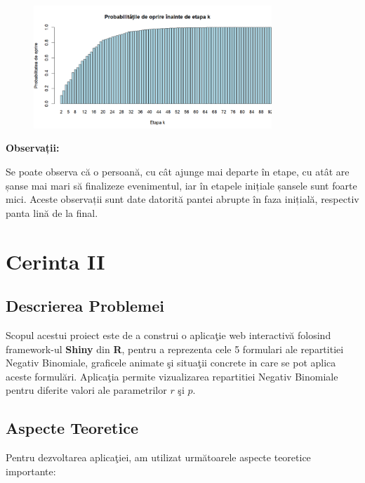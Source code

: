 \documentclass[a4paper,11pt]{article}
\begin{document}
\begin{figure}[h!]
    \centering
    \includegraphics[width=0.8\textwidth]{./img/3.png} %
    \label{fig:imaginea_ta_3}
\end{figure}
\newpage
\textbf{Observații:}

Se poate observa că o persoană, cu cât ajunge mai departe în etape, cu atât are șanse mai mari să finalizeze evenimentul, iar în etapele inițiale șansele sunt foarte mici. Aceste observații sunt date datorită pantei abrupte în faza inițială, respectiv panta lină de la final.

\newpage

\section*{Cerinta II}

\subsection*{Descrierea Problemei}

Scopul acestui proiect este de a construi o aplica\c{t}ie web interactiv\u{a} folosind framework-ul \textbf{Shiny} din \textbf{R}, pentru a reprezenta cele 5 formulari ale repartitiei Negativ Binomiale, graficele animate \c{s}i situa\c{t}ii concrete in care se pot aplica aceste formul\u{a}ri. Aplica\c{t}ia permite vizualizarea repartitiei Negativ Binomiale pentru diferite valori ale parametrilor \( r \) \c{s}i \( p \).

\subsection*{Aspecte Teoretice}
Pentru dezvoltarea aplica\c{t}iei, am utilizat urm\u{a}toarele aspecte teoretice importante:
\newline
\end{document}
